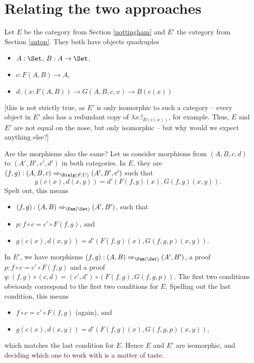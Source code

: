 \documentclass{article}
\begin{document}
\section{Relating the two approaches}

Let $E$ be the category from Section \ref{nottingham} and $E'$ the category from Section \ref{anton}.
They both have objects quadruples
\begin{itemize}
\item $A : \Set$, $B : A \to \Set$,
\item $c : F(A, B) \to A$,
\item $d : (x : F(A, B)) \to G(A, B, c, x) \to B(c(x))$
\end{itemize}
[this is not strictly true, as $E'$ is only isomorphic to such a
category -- every object in $E'$ also has a redundant copy of $\lambda
x . !_{B(c(x))}$, for example. Thus, $E$ and $E'$ are not equal on the
nose, but only isomorphic -- but why would we expect anything else?]

Are the morphisms also the same? Let us consider morphisms from $(A,
B, c, d)$ to $(A', B', c', d')$ in both categories.  In $E$, they are
$(f, g) : (A, B, c) \Rightarrow_{\Bialg(F, U)} (A', B', c')$ such that
  \[
  g(c(x), d(x, y)) = d'(F(f,g)(x), G(f,g)(x, y)).
  \]
Spelt out, this means
\begin{itemize}
\item $(f, g) : (A, B) \Rightarrow_{\Fam(\Set)} (A', B')$, such that
\item $p : f \circ c = c' \circ F(f,g)$, and
\item $g(c(x), d(x, y)) = d'(F(f,g)(x), G(f,g, p)(x, y))$.
\end{itemize}

In $E'$, we have morphisms $(f, g) : (A, B) \Rightarrow_{\Fam(\Set)} (A', B')$, a proof $p : f
\circ c = c' \circ F(f, g)$ and a proof $q : (f, g) \circ (c,
d) = (c', d') \circ (F(f,g), G(f, g, p))$. The first two conditions obviously correspond to the first two conditions for $E$. Spelling out the last condition, this means
\begin{itemize}
\item $f \circ c = c' \circ F(f,g)$ (again), and
\item $g(c(x), d(x, y)) = d'(F(f,g)(x), G(f,g, p)(x, y))$,
\end{itemize}
which matches the last condition for $E$. Hence $E$ and $E'$ are
isomorphic, and deciding which one to work with is a matter of taste.
\end{document}
